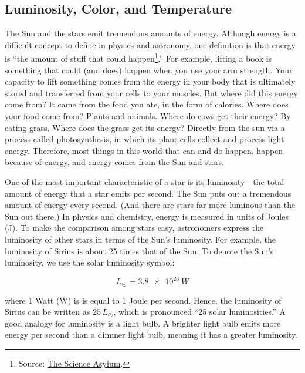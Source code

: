 \documentclass{article}
\numberwithin{equation}{section}
\numberwithin{figure}{section}
\begin{document}




\subsection{Luminosity, Color, and Temperature} \label{duzZXq}

The Sun and the stars emit tremendous amounts of energy. Although energy is a difficult concept to define in physics and astronomy, one definition is that energy is ``the amount of stuff that could happen\footnote{Source: \href{https://youtu.be/snj1wBtn6I8}{The Science Asylum}.}.'' For example, lifting a book is something that could (and does) happen when you use your arm strength. Your capacity to lift something comes from the energy in your body that is ultimately stored and transferred from your cells to your muscles. But where did this energy come from? It came from the food you ate, in the form of calories.  Where does your food come from? Plants and animals. Where do cows get their energy? By eating grass. Where does the grass get its energy? Directly from the sun via a process called photosynthesis, in which its plant cells collect and process light energy. Therefore, most things in this world that can and do happen, happen because of energy, and energy comes from the Sun and stars. 

\vspace{1em}

One of the most important characteristic of a star is its \gls{luminosity}---the total amount of energy that a star emits per second. The Sun puts out a tremendous amount of energy every second. (And there are stars far more luminous than the Sun out there.) In physics and chemistry, energy is measured in units of Joules (J). To make the comparison among stars easy, astronomers express the luminosity of other stars in terms of the Sun's luminosity. For example, the luminosity of Sirius is about 25 times that of the Sun. To denote the Sun's luminosity, we use the solar luminosity symbol:

\begin{equation}
    L_{\Sun} = \SI{3.8e26}{W}
\end{equation}

where 1 Watt (W) is is equal to 1 Joule per second. Hence, the luminosity of Sirius can be written as $25\, L_{\Sun}$, which is pronounced ``25 solar luminosities.'' A good analogy for luminosity is a light bulb. A brighter light bulb emits more energy per second than a dimmer light bulb, meaning it has a greater luminosity. 
\end{document}
